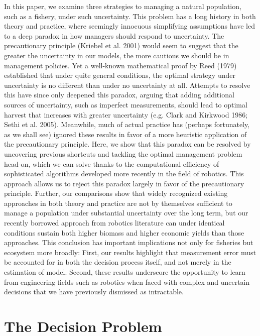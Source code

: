 \documentclass[3p]{elsarticle} %
\begin{document}
In this paper, we examine three strategies to managing a natural
population, such as a fishery, under such uncertainty. This problem has
a long history in both theory and practice, where seemingly innocuous
simplifying assumptions have led to a deep paradox in how managers
should respond to uncertainty. The precautionary principle (Kriebel et
al. 2001) would seem to suggest that the greater the uncertainty in our
models, the more cautious we should be in management policies. Yet a
well-known mathematical proof by Reed (1979) established that under
quite general conditions, the optimal strategy under uncertainty is no
different than under no uncertainty at all. Attempts to resolve this
have since only deepened this paradox, arguing that adding additional
sources of uncertainty, such as imperfect measurements, should lead to
optimal harvest that increases with greater uncertainty (e.g. Clark and
Kirkwood 1986; Sethi et al. 2005). Meanwhile, much of actual practice
has (perhaps fortunately, as we shall see) ignored these results in
favor of a more heuristic application of the precautionary principle.
Here, we show that this paradox can be resolved by uncovering previous
shortcuts and tackling the optimal management problem head-on, which we
can solve thanks to the computational efficiency of sophisticated
algorithms developed more recently in the field of robotics. This
approach allows us to reject this paradox largely in favor of the
precautionary principle. Further, our comparisons show that widely
recognized existing approaches in both theory and practice are not by
themselves sufficient to manage a population under substantial
uncertainty over the long term, but our recently borrowed approach from
robotics literature can under identical conditions sustain both higher
biomass and higher economic yields than those approaches. This
conclusion has important implications not only for fisheries but
ecosystem more broadly: First, our results highlight that measurement
error must be accounted for in both the decision process itself, and not
merely in the estimation of model. Second, these results underscore the
opportunity to learn from engineering fields such as robotics when faced
with complex and uncertain decisions that we have previously dismissed
as intractable.

\hypertarget{the-decision-problem}{%
\section{The Decision Problem}\label{the-decision-problem}}
\end{document}
